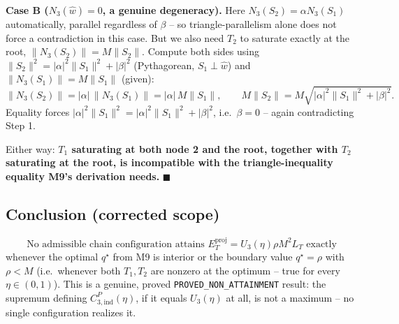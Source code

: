 \textbf{Case B ($N_3(\hat w)=0$, a genuine degeneracy).} Here
$N_3(S_2)=\alpha N_3(S_1)$ automatically, parallel regardless of $\beta$
-- so triangle-parallelism alone does not force a contradiction in this
case. But we also need $T_2$ to saturate exactly at the root,
$\|N_3(S_2)\|=M\|S_2\|$. Compute both sides using $\|S_2\|^2=|\alpha|^2
\|S_1\|^2+|\beta|^2$ (Pythagorean, $S_1\perp\hat w$) and $\|N_3(S_1)\|=
M\|S_1\|$ (given):
\[
  \|N_3(S_2)\| = |\alpha|\,\|N_3(S_1)\| = |\alpha|\,M\|S_1\|,
  \qquad
  M\|S_2\| = M\sqrt{|\alpha|^2\|S_1\|^2+|\beta|^2}.
\]
Equality forces $|\alpha|^2\|S_1\|^2=|\alpha|^2\|S_1\|^2+|\beta|^2$, i.e.\
$\beta=0$ -- again contradicting Step 1.

Either way: \textbf{$T_1$ saturating at both node 2 and the root,
together with $T_2$ saturating at the root, is incompatible with the
triangle-inequality equality M9's derivation needs.} $\blacksquare$

\subsection*{Conclusion (corrected scope)}
\label{sec:m10-conclusion}

\[
  \boxed{\text{No admissible chain configuration attains $E_T^{\mathrm{proj}}=U_3(\eta)\rho M^2L_T$ exactly}}
\]
whenever the optimal $q^\star$ from M9 is interior or the boundary value
$q^\star=\rho$ with $\rho<M$ (i.e.\ whenever both $T_1,T_2$ are nonzero at
the optimum -- true for every $\eta\in(0,1)$). This is a genuine, proved
\texttt{PROVED\_NON\_ATTAINMENT} result: the supremum defining
$C_{3,\mathrm{ind}}^P(\eta)$, if it equals $U_3(\eta)$ at all, is not a
maximum -- no single configuration realizes it.

